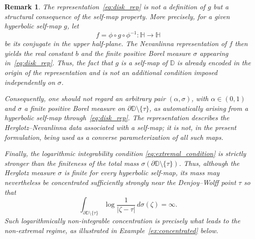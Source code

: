 \documentclass[10pt,a4paper]{amsart}
\numberwithin{equation}{section}
\newtheorem{remark}[equation]{Remark}
\begin{document}
\begin{remark}
\label{rem:self_map_constraint}
The representation~\eqref{eq:disk_rep} is not a definition of $g$ but a
structural consequence of the self-map property. More precisely, for a
given hyperbolic self-map $g$, let
\[
f=\phi\circ g\circ\phi^{-1}:\mathbb H\to\mathbb H
\]
be its conjugate in the upper half-plane. The Nevanlinna representation
of $f$ then yields the real constant $b$ and the finite positive Borel
measure $\sigma$ appearing in~\eqref{eq:disk_rep}. Thus, the fact that
$g$ is a self-map of $\mathbb D$ is already encoded in the origin of the
representation and is not an additional condition imposed independently
on $\sigma$.

Consequently, one should not regard an arbitrary pair
$(\alpha,\sigma)$, with $\alpha\in(0,1)$ and $\sigma$ a finite positive
Borel measure on
$\partial\mathbb D\setminus\{\tau\}$, as automatically arising from a
hyperbolic self-map through~\eqref{eq:disk_rep}. The representation
describes the Herglotz--Nevanlinna data associated with a self-map; it is
not, in the present formulation, being used as a converse
parameterization of all such maps.

Finally, the logarithmic integrability condition
\eqref{eq:extremal_condition} is strictly stronger than the finiteness
of the total mass
$\sigma(\partial\mathbb D\setminus\{\tau\})$. Thus, although the
Herglotz measure $\sigma$ is finite for every hyperbolic self-map, its
mass may nevertheless be concentrated sufficiently strongly near the
Denjoy--Wolff point $\tau$ so that
\[
\int_{\partial\mathbb D\setminus\{\tau\}}
\log\frac{1}{|\zeta-\tau|}
\,d\sigma(\zeta)
=\infty.
\]
Such logarithmically non-integrable concentration is precisely what
leads to the non-extremal regime, as illustrated in
Example~\ref{ex:concentrated} below.
\end{remark}
\end{document}
